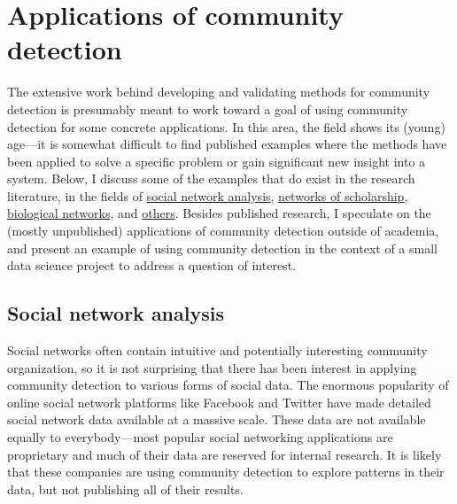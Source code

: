 \section{Applications of community
detection}\label{applications-of-community-detection}

The extensive work behind developing and validating methods for
community detection is presumably meant to work toward a goal of using
community detection for some concrete applications. In this area, the
field shows its (young) age---it is somewhat difficult to find published
examples where the methods have been applied to solve a specific problem
or gain significant new insight into a system. Below, I discuss some of
the examples that do exist in the research literature, in the fields of
\protect\hyperlink{social-network-analysis}{social network analysis},
\protect\hyperlink{networks-of-scholarship}{networks of scholarship},
\protect\hyperlink{biological-networks}{biological networks}, and
\protect\hyperlink{other-research}{others}. Besides published research,
I speculate on the (mostly unpublished) applications of community
detection outside of academia, and present an example of using community
detection in the context of a small data science project to address a
question of interest.

\hypertarget{social-network-analysis}{\subsection{Social network
analysis}\label{social-network-analysis}}

Social networks often contain intuitive and potentially interesting
community organization, so it is not surprising that there has been
interest in applying community detection to various forms of social
data. The enormous popularity of online social network platforms like
Facebook and Twitter have made detailed social network data available at
a massive scale. These data are not available equally to
everybody---most popular social networking applications are proprietary
and much of their data are reserved for internal research. It is likely
that these companies are using community detection to explore patterns
in their data, but not publishing all of their results.

